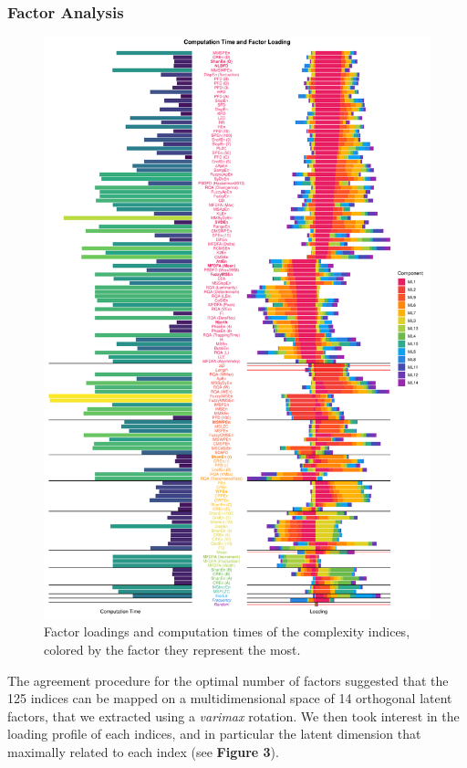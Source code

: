 \documentclass[
  man]{apa6}
\begin{document}
\hypertarget{factor-analysis}{%
\subsubsection{Factor Analysis}\label{factor-analysis}}

\begin{figure}
\centering
\includegraphics{manuscript_files/figure-latex/loadings-1.pdf}
\caption{\label{fig:loadings}Factor loadings and computation times of the complexity indices, colored by the factor they represent the most.}
\end{figure}

The agreement procedure for the optimal number of factors suggested that the 125 indices can be mapped on a multidimensional space of 14 orthogonal latent factors, that we extracted using a \emph{varimax} rotation. We then took interest in the loading profile of each indices, and in particular the latent dimension that maximally related to each index (see \textbf{Figure 3}).
\end{document}
